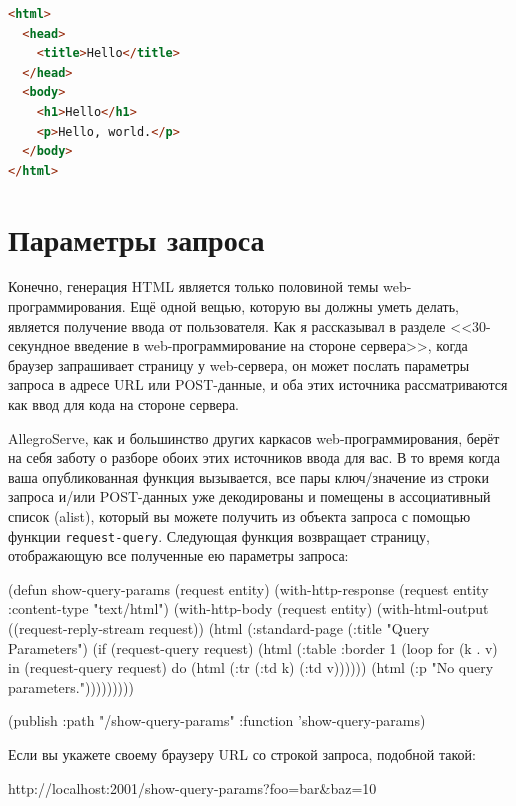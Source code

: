 \begin{lstlisting}[language=HTML]
<html>
  <head>
    <title>Hello</title>
  </head>
  <body>
    <h1>Hello</h1>
    <p>Hello, world.</p>
  </body>
</html>
\end{lstlisting}

\section{Параметры запроса}

Конечно, генерация HTML является только половиной темы web-программирования. Ещё одной
вещью, которую вы должны уметь делать, является получение ввода от пользователя. Как я
рассказывал в разделе <<30-секундное введение в web-программирование на стороне сервера>>,
когда браузер запрашивает страницу у web-сервера, он может послать параметры запроса в
адресе URL или POST-данные, и оба этих источника рассматриваются как ввод для кода на
стороне сервера.

AllegroServe, как и большинство других каркасов web-программирования, берёт на себя заботу
о разборе обоих этих источников ввода для вас. В то время когда ваша опубликованная
функция вызывается, все пары ключ/значение из строки запроса и/или POST-данных уже
декодированы и помещены в ассоциативный список (alist), который вы можете получить из
объекта запроса с помощью функции \lstinline{request-query}. Следующая функция возвращает
страницу, отображающую все полученные ею параметры запроса:

\begin{myverb}
(defun show-query-params (request entity)
  (with-http-response (request entity :content-type "text/html")
    (with-http-body (request entity)
      (with-html-output ((request-reply-stream request))
        (html
          (:standard-page
           (:title "Query Parameters")
           (if (request-query request)
             (html 
               (:table :border 1
                       (loop for (k . v) in (request-query request)
                          do (html (:tr (:td k) (:td v))))))
             (html (:p "No query parameters.")))))))))

(publish :path "/show-query-params" :function 'show-query-params)
\end{myverb}

Если вы укажете своему браузеру URL со строкой запроса, подобной такой:

\begin{myverb}
http://localhost:2001/show-query-params?foo=bar&baz=10
\end{myverb}

